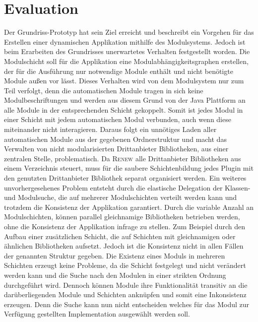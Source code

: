 \section{Evaluation}
	Der Grundriss-Prototyp hat sein Ziel erreicht und beschreibt ein Vorgehen für das Erstellen einer dynamischen Applikation mithilfe des Modulsystems. Jedoch ist beim Erarbeiten des Grundrisses unerwartetes Verhalten festgestellt worden.
	Die Modulschicht soll für die Applikation eine Modulabhängigkeitsgraphen erstellen, der für die Ausführung nur notwendige Module enthält und nicht benötigte Module außen vor lässt. Dieses Verhalten wird von dem Modulsystem nur zum Teil verfolgt, denn die automatischen Module tragen in sich keine Modulbeschriftungen und werden aus diesem Grund von der Java Plattform an alle Module in der entsprechenden Schicht gekoppelt. Somit ist jedes Modul in einer Schicht mit jedem automatischen Modul verbunden, auch wenn diese miteinander nicht interagieren. Daraus folgt ein unnötiges Laden aller automatischen Module aus der gegebenen Ordnerstruktur und macht das Verwalten von nicht modularisierten Drittanbieter Bibliotheken, aus einer zentralen Stelle, problematisch. Da \textsc{Renew} alle Drittanbieter Bibliotheken aus einem Verzeichnis steuert, muss für die saubere Schichtenbildung jedes Plugin mit den genutzten Drittanbieter Bibliothek separat organisiert werden.\newline
	Ein weiteres unvorhergesehenes Problem entsteht durch die elastische Delegation der Klassen- und Modulsuche, die auf mehrerer Modulschichten verteilt werden kann und trotzdem die Konsistenz der Applikation garantiert.
	Durch die variable Anzahl an Modulschichten, können parallel gleichnamige Bibliotheken betrieben werden, ohne die Konsistenz der Applikation infrage zu stellen. Zum Beispiel durch den Aufbau einer zusätzlichen Schicht, die auf Schichten mit gleichnamigen oder ähnlichen Bibliotheken aufsetzt. Jedoch ist die Konsistenz nicht in allen Fällen der genannten Struktur gegeben. \newline
	Die Existenz eines Moduls in mehreren Schichten erzeugt keine Probleme, da die Schicht festgelegt und nicht verändert werden kann und die Suche nach den Modulen in einer strikten Ordnung durchgeführt wird. Dennoch können Module ihre Funktionalität transitiv an die darüberliegenden Module und Schichten anknüpfen und somit eine Inkonsistenz erzeugen. Denn die Suche kann nun nicht entscheiden welches für das Modul zur Verfügung gestellten Implementation ausgewählt werden soll. \newline
